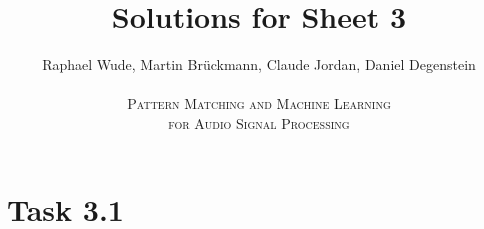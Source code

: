 \documentclass[12pt]{article}
\begin{document}
\title{Solutions for Sheet 3}
\author{Raphael Wude, Martin Brückmann, Claude Jordan, Daniel Degenstein\\ \\
\textsc{Pattern Matching and Machine Learning} \\
\textsc{for Audio Signal Processing}}
\maketitle

\section*{Task 3.1}
\end{document}

